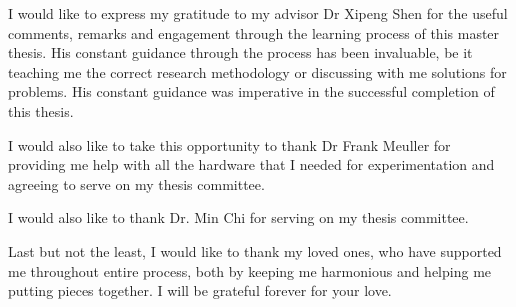 \begin{acknowledgements}

I would like to express my gratitude to my advisor Dr Xipeng Shen  for the useful comments, remarks and engagement through the learning process of this master thesis. His constant guidance through the process has been invaluable, be it teaching me the correct research methodology or discussing with me solutions for problems. His constant guidance was imperative in the successful completion of this thesis.

I would also like to take this opportunity to thank Dr Frank Meuller for providing me help with all the hardware that I needed for experimentation and agreeing to serve on my thesis committee. 

I would also like to thank Dr. Min Chi for serving on my thesis committee.

Last but not the least, I would like to thank my loved ones, who have supported me throughout entire process, both by keeping me harmonious and helping me putting pieces together. I will be grateful forever for your love.

\end{acknowledgements}


\thesistableofcontents

\thesislistoftables

\thesislistoffigures